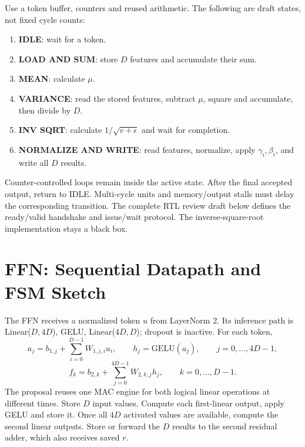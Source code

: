 \documentclass[11pt,a4paper]{article}
\begin{document}
Use a token buffer, counters and reused arithmetic. The following are draft
states, not fixed cycle counts:
\begin{enumerate}
\item \textbf{IDLE}: wait for a token.
\item \textbf{LOAD AND SUM}: store $D$ features and accumulate their sum.
\item \textbf{MEAN}: calculate $\mu$.
\item \textbf{VARIANCE}: read the stored features, subtract $\mu$, square and accumulate, then divide by $D$.
\item \textbf{INV SQRT}: calculate $1/\sqrt{v+\epsilon}$ and wait for completion.
\item \textbf{NORMALIZE AND WRITE}: read features, normalize, apply $\gamma_i,\beta_i$, and write all $D$ results.
\end{enumerate}
Counter-controlled loops remain inside the active state. After the final
accepted output, return to IDLE. Multi-cycle units and memory/output stalls
must delay the corresponding transition. The complete RTL review draft below
defines the ready/valid handshake and issue/wait protocol.
The inverse-square-root implementation stays a black box.

\section{FFN: Sequential Datapath and FSM Sketch}

The FFN receives a normalized token $u$ from LayerNorm 2. Its inference path
is Linear($D,4D$), GELU, Linear($4D,D$); dropout is inactive. For each token,
\[
a_j=b_{1,j}+\sum_{i=0}^{D-1}W_{1,j,i}u_i,\qquad
h_j=\mathrm{GELU}(a_j),\qquad j=0,\ldots,4D-1,
\]
\[
f_k=b_{2,k}+\sum_{j=0}^{4D-1}W_{2,k,j}h_j,\qquad k=0,\ldots,D-1.
\]
The proposal reuses one MAC engine for both logical linear operations at
different times. Store $D$ input values. Compute each first-linear output,
apply GELU and store it. Once all $4D$ activated values are available, compute
the second linear outputs. Store or forward the $D$ results to the second
residual adder, which also receives saved $r$.

\begin{center}
\end{center}
\end{document}
